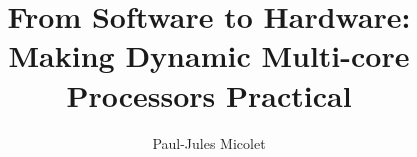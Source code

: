 \documentclass[phd,icsa,twoside]{infthesis}
\title{From Software to Hardware: Making Dynamic Multi-core Processors Practical}
\author{Paul-Jules Micolet}
\begin{document}
\begin{preliminary}

\maketitle



\standarddeclaration


\tableofcontents


\end{preliminary}


\label{chp:bg}




\label{chp3}






%




\end{document}
